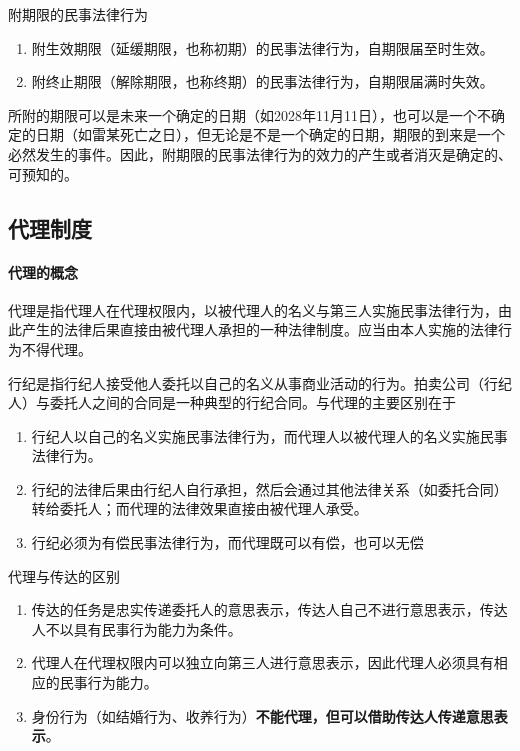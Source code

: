 \documentclass[UTF8,12pt]{ctexart}
\numberwithin{equation}{section} %
\numberwithin{figure}{section}
\numberwithin{table}{section}
\begin{document}
	附期限的民事法律行为
	\begin{enumerate}
		\item 附生效期限（延缓期限，也称初期）的民事法律行为，自期限届至时生效。
		
		\item 附终止期限（解除期限，也称终期）的民事法律行为，自期限届满时失效。
	\end{enumerate}
	
	所附的期限可以是未来一个确定的日期（如2028年11月11日），也可以是一个不确定的日期（如雷某死亡之日），但无论是不是一个确定的日期，期限的到来是一个必然发生的事件。因此，附期限的民事法律行为的效力的产生或者消灭是确定的、可预知的。
	
	
	\subsection{代理制度}
	
	\paragraph{代理的概念}
	代理是指代理人在代理权限内，以被代理人的名义与第三人实施民事法律行为，由此产生的法律后果直接由被代理人承担的一种法律制度。应当由本人实施的法律行为不得代理。
	
	行纪是指行纪人接受他人委托以自己的名义从事商业活动的行为。拍卖公司（行纪人）与委托人之间的合同是一种典型的行纪合同。与代理的主要区别在于
	\begin{enumerate}
		\item 行纪人以自己的名义实施民事法律行为，而代理人以被代理人的名义实施民事法律行为。
		
		\item 行纪的法律后果由行纪人自行承担，然后会通过其他法律关系（如委托合同）转给委托人；而代理的法律效果直接由被代理人承受。
	
		\item 行纪必须为有偿民事法律行为，而代理既可以有偿，也可以无偿
	\end{enumerate}
	
	代理与传达的区别
	\begin{enumerate}
		\item 传达的任务是忠实传递委托人的意思表示，传达人自己不进行意思表示，传达人不以具有民事行为能力为条件。
		
		\item 代理人在代理权限内可以独立向第三人进行意思表示，因此代理人必须具有相应的民事行为能力。
		
		\item 身份行为（如结婚行为、收养行为）\textbf{不能代理，但可以借助传达人传递意思表示}。
		
	\end{enumerate}
\end{document}

